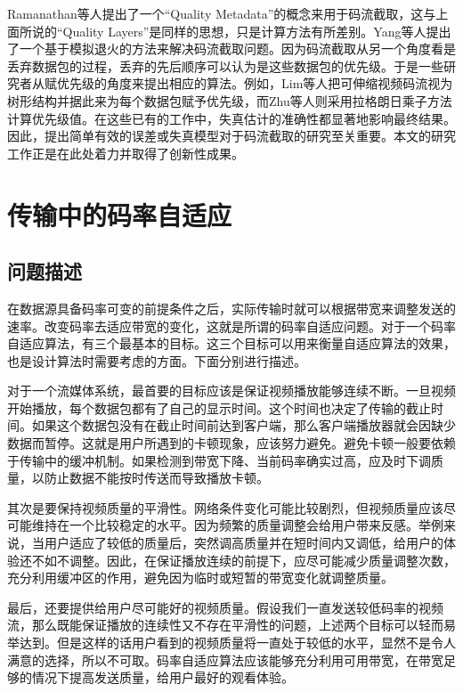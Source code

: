 Ramanathan等人\supercite{Ramanathan2012}提出了一个“Quality Metadata”的概念来用于码流截取，这与上面所说的“Quality Layers”是同样的思想，只是计算方法有所差别。Yang等人\supercite{Yang2013}提出了一个基于模拟退火的方法来解决码流截取问题。因为码流截取从另一个角度看是丢弃数据包的过程，丢弃的先后顺序可以认为是这些数据包的优先级。于是一些研究者从赋优先级的角度来提出相应的算法。例如，Lim等人\supercite{Lim2006}把可伸缩视频码流视为树形结构并据此来为每个数据包赋予优先级，而Zhu等人\supercite{Zhu2011}则采用拉格朗日乘子方法计算优先级值。在这些已有的工作中，失真估计的准确性都显著地影响最终结果。因此，提出简单有效的误差或失真模型对于码流截取的研究至关重要。本文的研究工作正是在此处着力并取得了创新性成果。


\section{传输中的码率自适应}

\subsection{问题描述}

在数据源具备码率可变的前提条件之后，实际传输时就可以根据带宽来调整发送的速率。改变码率去适应带宽的变化，这就是所谓的码率自适应问题。对于一个码率自适应算法，有三个最基本的目标。这三个目标可以用来衡量自适应算法的效果，也是设计算法时需要考虑的方面。下面分别进行描述。

对于一个流媒体系统，最首要的目标应该是保证视频播放能够连续不断。一旦视频开始播放，每个数据包都有了自己的显示时间。这个时间也决定了传输的截止时间。如果这个数据包没有在截止时间前达到客户端，那么客户端播放器就会因缺少数据而暂停。这就是用户所遇到的卡顿现象，应该努力避免。避免卡顿一般要依赖于传输中的缓冲机制。如果检测到带宽下降、当前码率确实过高，应及时下调质量，以防止数据不能按时传送而导致播放卡顿。

其次是要保持视频质量的平滑性。网络条件变化可能比较剧烈，但视频质量应该尽可能维持在一个比较稳定的水平。因为频繁的质量调整会给用户带来反感。举例来说，当用户适应了较低的质量后，突然调高质量并在短时间内又调低，给用户的体验还不如不调整。因此，在保证播放连续的前提下，应尽可能减少质量调整次数，充分利用缓冲区的作用，避免因为临时或短暂的带宽变化就调整质量。

最后，还要提供给用户尽可能好的视频质量。假设我们一直发送较低码率的视频流，那么既能保证播放的连续性又不存在平滑性的问题，上述两个目标可以轻而易举达到。但是这样的话用户看到的视频质量将一直处于较低的水平，显然不是令人满意的选择，所以不可取。码率自适应算法应该能够充分利用可用带宽，在带宽足够的情况下提高发送质量，给用户最好的观看体验。

